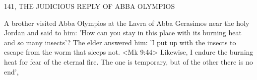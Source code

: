 141, THE JUDICIOUS REPLY OF ABBA OLYMPIOS

A brother visited Abba Olympios at the Lavra of Abba Gerasimos
near the holy Jordan and said to him: 'How can you stay in this
place with its burning heat and so many insects'? The elder
answered him: 'I put up with the insects to escape from the worm
that sleeps not. <Mk 9:44> Likewise, I endure the burning heat for
fear of the eternal fire. The one is temporary, but of the other there
is no end',

